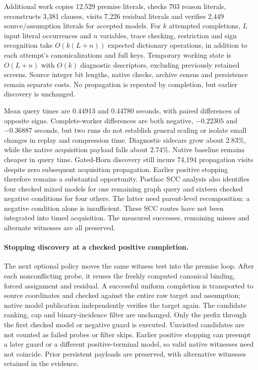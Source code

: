 \documentclass[11pt,a4paper]{article}
\numberwithin{equation}{section}
\theoremstyle{plain}
\theoremstyle{definition}
\theoremstyle{remark}
\begin{document}
Additional work copies 12,529 premise literals, checks 703 reason literals,
reconstructs 3,381 clauses, visits 7,226 residual literals and verifies 2,449
source/assumption literals for accepted models. For $k$ attempted completions,
$L$ input literal occurrences and $n$ variables, trace checking, restriction
and sign recognition take $O(k(L+n))$ expected dictionary operations, in addition
to each attempt's canonicalizations and full keys. Temporary working state is
$O(L+n)$ with $O(k)$ diagnostic descriptors, excluding previously retained
screens. Source integer bit lengths, native checks, archive census and
persistence remain separate costs. No propagation is repeated by completion,
but earlier discovery is unchanged.

Mean query times are 0.44913 and 0.44780 seconds, with paired differences of
opposite signs. Complete-worker differences are both negative, $-0.22305$ and
$-0.36887$ seconds, but two runs do not establish general scaling or isolate
small changes in replay and compression time. Diagnostic sidecars grow about
2.83\%, while the native acquisition payload falls about 2.74\%. Native baseline
remains cheaper in query time. Gated-Horn discovery still incurs 74,194
propagation visits despite zero subsequent acquisition propagation. Earlier
positive stopping therefore remains a substantial opportunity. Posthoc SCC
analysis also identifies four checked mixed models for one remaining graph
query and sixteen checked negative conditions for four others. The latter need
parent-level recomposition: a negative condition alone is insufficient. These
SCC routes have not been integrated into timed acquisition. The measured
successes, remaining misses and alternate witnesses are all preserved.

\paragraph{Stopping discovery at a checked positive completion.}
The next optional policy moves the same witness test into the premise loop.
After each nonconflicting probe, it reuses the freshly computed canonical
binding, forced assignment and residual. A successful uniform completion is
transported to source coordinates and checked against the entire raw target
and assumption; native model publication independently verifies the target
again. The candidate ranking, cap and binary-incidence filter are unchanged.
Only the prefix through the first checked model or negative guard is executed.
Unvisited candidates are not counted as failed probes or filter skips. Earlier
positive stopping can preempt a later guard or a different positive-terminal
model, so valid native witnesses need not coincide. Prior persistent payloads
are preserved, with alternative witnesses retained in the evidence.
\end{document}
